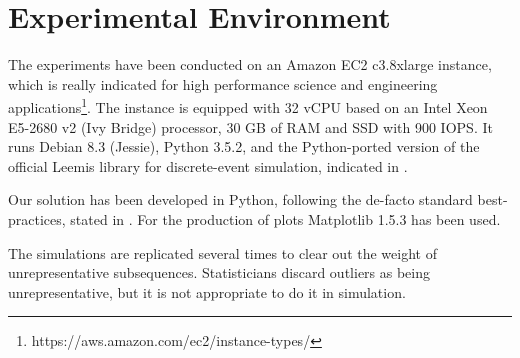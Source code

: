 \section{Experimental Environment}
\label{sec:experimental-analysis}

The experiments have been conducted on an Amazon EC2 c3.8xlarge instance, which is really indicated for high performance science and engineering applications\footnote{https://aws.amazon.com/ec2/instance-types/}. 
The instance is equipped with 32 vCPU based on an Intel Xeon E5-2680 v2 (Ivy Bridge) processor, 30 GB of RAM and SSD with 900 IOPS. 
It runs Debian 8.3 (Jessie), Python 3.5.2, and the Python-ported version of the official Leemis library for discrete-event simulation, indicated in \cite{leemis2006discrete}.

Our solution has been developed in Python, following the de-facto standard best-practices, stated in \cite{reitz2016}. For the production of plots Matplotlib 1.5.3 has been used.

The simulations are replicated several times to clear out the weight of unrepresentative subsequences.
Statisticians discard outliers as being unrepresentative, but it is not appropriate to do it in simulation.